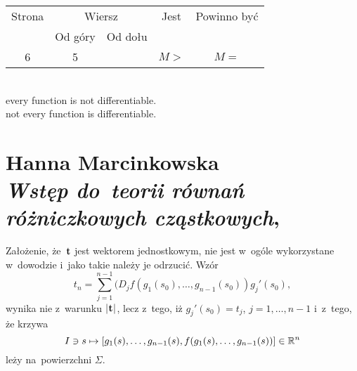 \documentclass[a4paper,11pt]{article}
\numberwithin{equation}{section}
\begin{document}


\begin{center}

  \begin{tabular}{|c|c|c|c|c|}
    \hline
    Strona & \multicolumn{2}{c|}{Wiersz} & Jest
                              & Powinno być \\ \cline{2-3}
    & Od góry & Od dołu & & \\
    \hline
    6   &  5 & & $M >$ & $M =$ \\
    \hline
  \end{tabular}

\end{center}

\VerSpaceTwo


\noindent
{} \\
\Jest every function is not differentiable. \\
\PowinnoByc not every function is differentiable. \\















\newpage

\section{ %
  Hanna Marcinkowska \\
  \textit{Wstęp do~teorii równań różniczkowych cząstkowych},
  \cite{MarcinkowskaWstepRownanRozniczkowychCzastkowych1986}}

\vspace{0em}




\noindent
{} Założenie, że~$\mathbf{t}$ jest wektorem jednostkowym, nie
jest w~ogóle wykorzystane w~dowodzie i~jako takie należy je odrzucić. Wzór
\begin{equation}
  \label{eq:MarcinkowskaWDTRRCz-01}
  t_{ n } =
  \sum_{ j = 1 }^{ n - 1 } ( D_{ j } f\left( g_{ 1 }( s_{ 0 } ), \ldots,
  g_{ n - 1 }( s_{ 0 } ) \right) g_{ j }'( s_{ 0 } ),
\end{equation}
wynika nie z~warunku $| \hspace{0.05em}  \mathbf{t}  \hspace{0.05em} |$, lecz z~tego,
iż $g_{ j }'( s_{ 0 } ) = t_{ j }$, $j = 1, \ldots, n - 1$ i~z~tego, że krzywa
\begin{equation}
  \label{eq:MarcinkowskaWDTRRCz-02}
  I \ni s \mapsto [ g_{ 1 }( s ), \ldots, g_{ n - 1 }( s ),
  f( g_{ 1 }( s ), \ldots, g_{ n - 1 }( s ) ) ] \in \mathbb{R}^{ n }
\end{equation}
leży na~powierzchni $\Sigma$.
\end{document}

